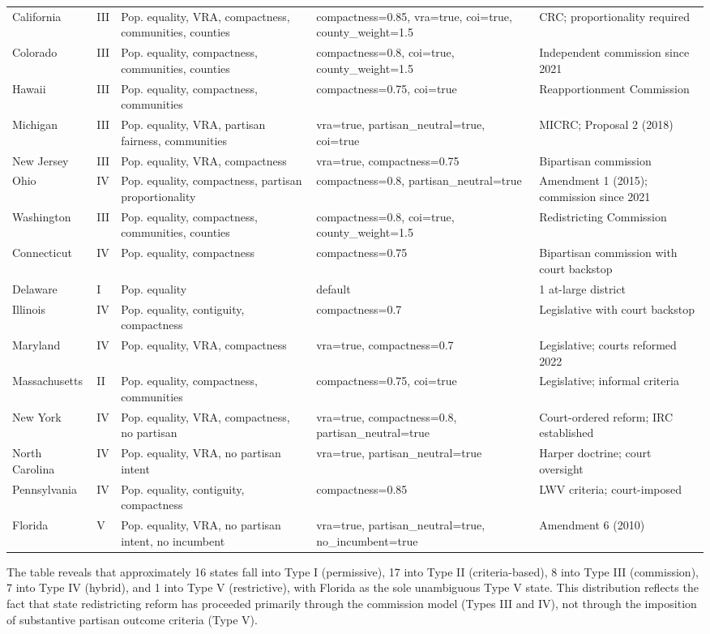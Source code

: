 \begin{landscape}
\begin{longtable}{lllll}
California & III & Pop. equality, VRA, compactness, communities, counties & compactness=0.85, vra=true, coi=true, county\_weight=1.5 & CRC; proportionality required\\
Colorado & III & Pop. equality, compactness, communities, counties & compactness=0.8, coi=true, county\_weight=1.5 & Independent commission since 2021\\
Hawaii & III & Pop. equality, compactness, communities & compactness=0.75, coi=true & Reapportionment Commission\\
Michigan & III & Pop. equality, VRA, partisan fairness, communities & vra=true, partisan\_neutral=true, coi=true & MICRC; Proposal 2 (2018)\\
New Jersey & III & Pop. equality, VRA, compactness & vra=true, compactness=0.75 & Bipartisan commission\\
Ohio & IV & Pop. equality, compactness, partisan proportionality & compactness=0.8, partisan\_neutral=true & Amendment 1 (2015); commission since 2021\\
Washington & III & Pop. equality, compactness, communities, counties & compactness=0.8, coi=true, county\_weight=1.5 & Redistricting Commission\\
Connecticut & IV & Pop. equality, compactness & compactness=0.75 & Bipartisan commission with court backstop\\
Delaware & I & Pop. equality & default & 1 at-large district\\
Illinois & IV & Pop. equality, contiguity, compactness & compactness=0.7 & Legislative with court backstop\\
Maryland & IV & Pop. equality, VRA, compactness & vra=true, compactness=0.7 & Legislative; courts reformed 2022\\
Massachusetts & II & Pop. equality, compactness, communities & compactness=0.75, coi=true & Legislative; informal criteria\\
New York & IV & Pop. equality, VRA, compactness, no partisan & vra=true, compactness=0.8, partisan\_neutral=true & Court-ordered reform; IRC established\\
North Carolina & IV & Pop. equality, VRA, no partisan intent & vra=true, partisan\_neutral=true & Harper doctrine; court oversight\\
Pennsylvania & IV & Pop. equality, contiguity, compactness & compactness=0.85 & LWV criteria; court-imposed\\
Florida & V & Pop. equality, VRA, no partisan intent, no incumbent & vra=true, partisan\_neutral=true, no\_incumbent=true & Amendment 6 (2010)\\
\end{longtable}
\end{landscape}

The table reveals that approximately 16 states fall into Type I (permissive), 17 into Type II (criteria-based), 8 into Type III (commission), 7 into Type IV (hybrid), and 1 into Type V (restrictive), with Florida as the sole unambiguous Type V state. This distribution reflects the fact that state redistricting reform has proceeded primarily through the commission model (Types III and IV), not through the imposition of substantive partisan outcome criteria (Type V).
